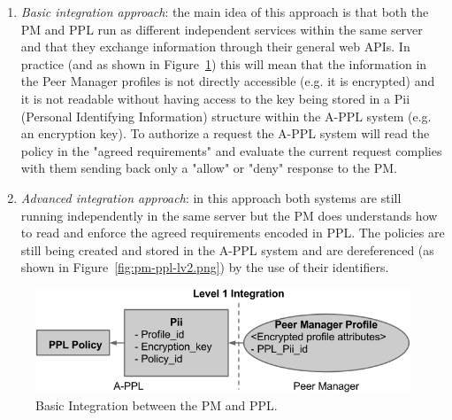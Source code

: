 \begin{enumerate}
	\item \emph{Basic integration approach}: the main idea of this approach is that both the PM and PPL run as different independent services within the same server and that they exchange information through their general web APIs. In practice (and as shown in Figure~\ref{fig:pm-ppl-lv1.png}) this will mean that the information in the Peer Manager profiles is not directly accessible (e.g. it is encrypted) and it is not readable without having access to the key being stored in a Pii (Personal Identifying Information) structure within the A-PPL system  (e.g. an encryption key). To authorize a request the A-PPL system will read the policy in the "agreed requirements" and evaluate the current request complies with them sending back only a "allow" or "deny" response to the PM. 
	\item \emph{Advanced integration approach}: in this approach both systems are still running independently in the same server but the PM does understands how to read and enforce the agreed requirements encoded in PPL. The policies are still being created and stored in the A-PPL system and are dereferenced (as shown in Figure~\ref{fig:pm-ppl-lv2.png}) by the use of their identifiers.
\end{enumerate}

\begin{figure}[htb!]
\centering
\includegraphics[width=0.8\linewidth]{figures/pm-ppl-lv1.png}
\caption{Basic Integration between the PM and PPL.}
\label{fig:pm-ppl-lv1.png}
\end{figure}

